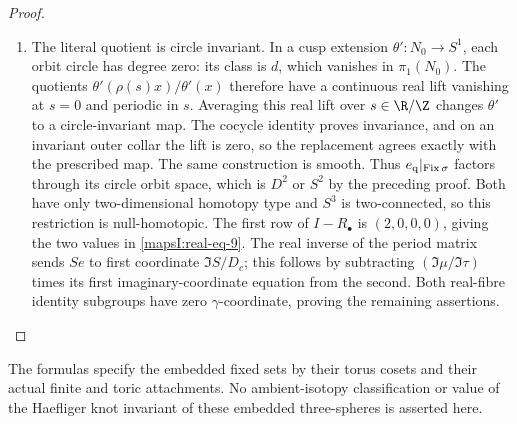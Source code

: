 \begin{proof}
\begin{enumerate}[label=\arabic*.,leftmargin=*]
\item The literal quotient is circle invariant. In a cusp extension
$\theta':N_0\to S^1$, each orbit circle has degree zero: its class is
$d$, which vanishes in $\pi_1(N_0)$. The quotients
$\theta'(\rho(s)x)/\theta'(x)$ therefore have a continuous real lift
vanishing at $s=0$ and periodic in $s$. Averaging this real lift over
$s\in\R/\Z$ changes $\theta'$ to a circle-invariant map. The cocycle
identity proves invariance, and on an invariant outer collar the lift
is zero, so the replacement agrees exactly with the prescribed map.
The same construction is smooth. Thus $e_{\rm q}|_{\operatorname{Fix}\sigma}$
factors through its circle orbit space, which is $D^2$ or $S^2$ by the
preceding proof. Both have only two-dimensional homotopy type and
$S^3$ is two-connected, so this restriction is null-homotopic.
The first row of $I-R_\bullet$ is $(2,0,0,0)$, giving the two values
in \eqref{mapsI:real-eq-9}. The real inverse of the period matrix sends $S e$ to
first coordinate $\Im S/D_c$; this follows by subtracting
$(\Im\mu/\Im\tau)$ times its first imaginary-coordinate equation
from the second. Both real-fibre identity subgroups have zero
$\gamma$-coordinate, proving the remaining assertions.
\end{enumerate}
\end{proof}

The formulas specify the embedded fixed sets by their torus cosets and
their actual finite and toric attachments. No ambient-isotopy
classification or value of the Haefliger knot invariant of these
embedded three-spheres is asserted here.


